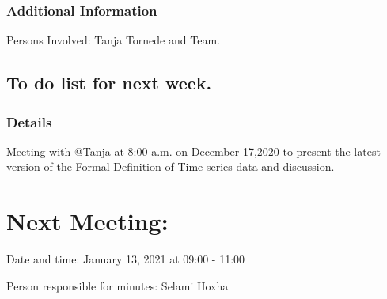 \documentclass[11pt]{meetingmins} %
\begin{document}
    \subsubsection{Additional Information}
        \begin{hiddensubitems}
            \item
                Persons Involved: Tanja Tornede and Team.
        \end{hiddensubitems}

\subsection{To do list for next week.}
    \subsubsection{Details}
        \begin{hiddensubitems}
            \item
                Meeting with @Tanja at 8:00 a.m. on December 17,2020 to present the latest version of the Formal Definition of Time series data and discussion.
        \end{hiddensubitems}
                        
\section{Next Meeting:}
    \begin{hiddensubitems}
        \item
            Date and time: January 13, 2021 at 09:00 - 11:00
        \item
            Person responsible for minutes: Selami Hoxha
    \end{hiddensubitems}
\end{document}
